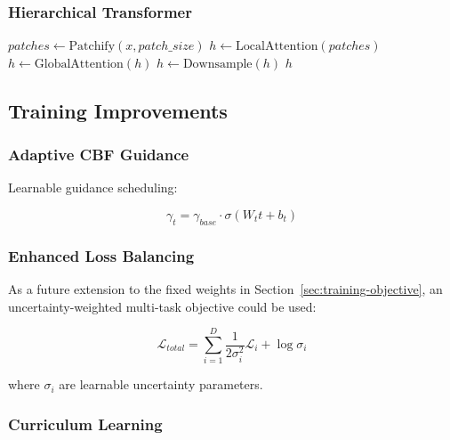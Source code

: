 \documentclass[12pt]{article}
\begin{document}
\subsubsection{Hierarchical Transformer}

\begin{algorithm}
\caption{Hierarchical Transformer Architecture}
\begin{algorithmic}[1]
\State $patches \gets \text{Patchify}(x, patch\_size)$
\State $h \gets \text{LocalAttention}(patches)$
\State $h \gets \text{GlobalAttention}(h)$
\State $h \gets \text{Downsample}(h)$
\EndFor
\Return $h$
\EndProcedure
\end{algorithmic}
\end{algorithm}

\subsection{Training Improvements}

\subsubsection{Adaptive CBF Guidance}

Learnable guidance scheduling:

\begin{equation}
\gamma_t = \gamma_{base} \cdot \sigma(W_t t + b_t)
\end{equation}

\subsubsection{Enhanced Loss Balancing}

As a future extension to the fixed weights in Section~\ref{sec:training-objective}, an uncertainty-weighted multi-task objective could be used:

\begin{equation}
\mathcal{L}_{total} = \sum_{i=1}^{D} \frac{1}{2\sigma_i^2} \mathcal{L}_i + \log \sigma_i
\end{equation}

where $\sigma_i$ are learnable uncertainty parameters.

\subsubsection{Curriculum Learning}
\end{document}
